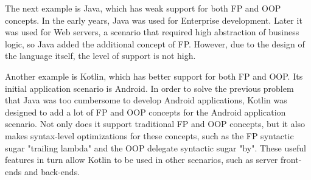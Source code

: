 The next example is Java, which has weak support for both FP and OOP concepts. In the early years, Java was used for Enterprise development. Later it was used for Web servers, a scenario that required high abstraction of business logic, so Java added the additional concept of FP. However, due to the design of the language itself, the level of support is not high.

Another example is Kotlin, which has better support for both FP and OOP. Its initial application scenario is Android. In order to solve the previous problem that Java was too cumbersome to develop Android applications, Kotlin was designed to add a lot of FP and OOP concepts for the Android application scenario. Not only does it support traditional FP and OOP concepts, but it also makes syntax-level optimizations for these concepts, such as the FP syntactic sugar "trailing lambda" and the OOP delegate syntactic sugar "by". These useful features in turn allow Kotlin to be used in other scenarios, such as server front-ends and back-ends.